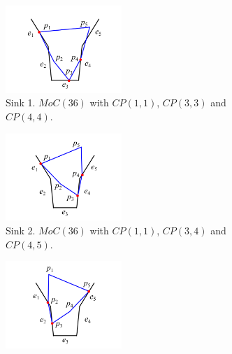 \documentclass[11pt, twocolumn]{article}
\begin{document}

\begin{figure}
\begin{center}
\begin{subfigure}[t]{0.24\textwidth}
\begin{center}
\includegraphics[height=1.3in]{figures/5_5_sink1.png}
\end{center}
\caption{Sink 1. $MoC(36)$ with $CP(1, 1)$, $CP(3, 3)$ and $CP(4, 4)$.}
\label{fig:5_5_sink1}
\end{subfigure}
\begin{subfigure}[t]{0.24\textwidth}
\begin{center}
\includegraphics[height=1.3in]{figures/5_5_sink2.png}
\end{center}
\caption{Sink 2. $MoC(36)$ with $CP(1, 1)$, $CP(3, 4)$ and $CP(4, 5)$. }
\label{fig:5_5_sink2}
\end{subfigure}
\begin{subfigure}[t]{0.24\textwidth}
\begin{center}
\includegraphics[height=1.3in]{figures/5_5_sink3.png}

\end{center}
\end{subfigure}
\end{center}
\end{figure}
\end{document}

